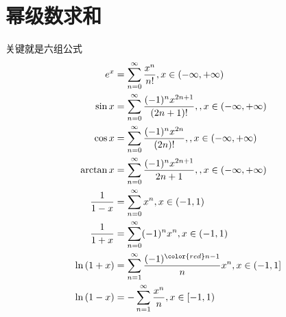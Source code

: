 \documentclass[12pt, a4paper, oneside, UTF8]{ctexbook}
\begin{document}
\section{幂级数求和}
\begin{remark}
    关键就是六组公式
    \begin{align*}
        e^x &=\sum_{n=0}^{\infty}\frac{x^n}{n!}, x\in(-\infty,+\infty) \\
        \sin{x} &=\sum_{n=0}^{\infty}\frac{(-1)^nx^{2n+1}}{(2n+1)!},, x\in(-\infty,+\infty) \\
        \cos{x} &=\sum_{n=0}^{\infty}\frac{(-1)^nx^{2n}}{(2n)!},, x\in(-\infty,+\infty) \\
        \arctan{x} &=\sum_{n=0}^{\infty}\frac{(-1)^nx^{2n+1}}{2n+1},, x\in(-\infty,+\infty) \\
        \frac{1}{1-x} &=\sum_{n=0}^{\infty}x^n,x\in(-1,1) \\
        \frac{1}{1+x} &=\sum_{n=0}^{\infty}(-1)^nx^n,x\in(-1,1) \\
        \ln{(1+x)} &=\sum_{n=1}^{\infty}\frac{(-1)^{\color{red}n-1}}{n}x^n, x\in(-1,1] \\
        \ln{(1-x)} &=-\sum_{n=1}^{\infty}\frac{x^n}{n}, x\in[-1,1) 
    \end{align*}
\end{remark}
\end{document}

